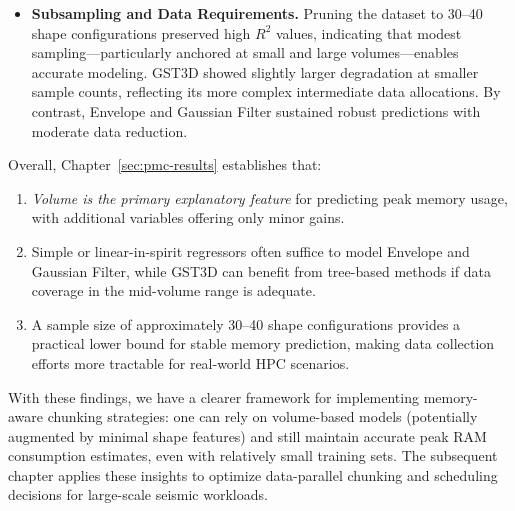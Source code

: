 \begin{itemize}
    \item \textbf{Subsampling and Data Requirements.}
    Pruning the dataset to 30–40 shape configurations preserved high $R^2$ values, indicating that modest sampling—particularly anchored at small and large volumes—enables accurate modeling.
    \ac{GST3D} showed slightly larger degradation at smaller sample counts, reflecting its more complex intermediate data allocations.
    By contrast, Envelope and Gaussian Filter sustained robust predictions with moderate data reduction.
\end{itemize}

Overall, Chapter~\ref{sec:pmc-results} establishes that:
\begin{enumerate}
    \item \emph{Volume is the primary explanatory feature} for predicting peak memory usage, with additional variables offering only minor gains.
    \item Simple or linear-in-spirit regressors often suffice to model Envelope and Gaussian Filter, while \ac{GST3D} can benefit from tree-based methods if data coverage in the mid-volume range is adequate.
    \item A sample size of approximately 30–40 shape configurations provides a practical lower bound for stable memory prediction, making data collection efforts more tractable for real-world \ac{HPC} scenarios.
\end{enumerate}

With these findings, we have a clearer framework for implementing memory-aware chunking strategies: one can rely on volume-based models (potentially augmented by minimal shape features) and still maintain accurate peak \ac{RAM} consumption estimates, even with relatively small training sets.
The subsequent chapter applies these insights to optimize data-parallel chunking and scheduling decisions for large-scale seismic workloads.